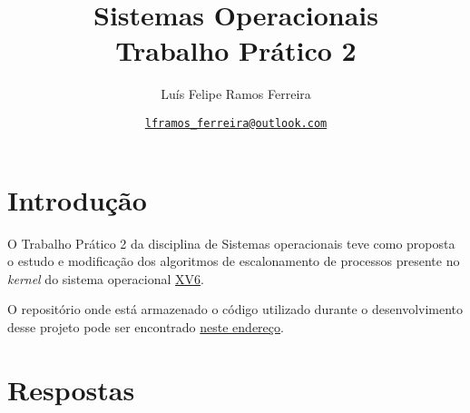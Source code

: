 \documentclass{article}
\title{Sistemas Operacionais \\ \large Trabalho Prático 2}
\author{Luís Felipe Ramos Ferreira}
\date{\href{mailto:lframos\_ferreira@outlook.com}{\texttt{lframos\_ferreira@outlook.com}}
}
\begin{document}
\maketitle

\section{Introdução}

O Trabalho Prático 2 da disciplina de Sistemas operacionais teve como proposta
o estudo e modificação dos algoritmos de escalonamento de processos presente
no \textit{kernel} do sistema operacional
\href{https://github.com/mit-pdos/xv6-public}{XV6}.

O repositório onde está armazenado o código utilizado durante o desenvolvimento
desse projeto
pode ser encontrado \href{https://github.com/lframosferreira/tp2-so}{neste
      endereço}.

\section{Respostas}
\end{document}
